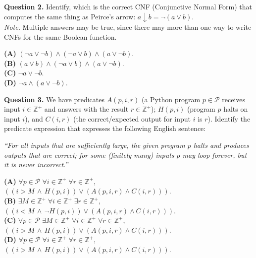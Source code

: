 \documentclass[jou]{apa6}
\begin{document}
\vspace{6pt}
{\bf Question 2.} Identify, which is the correct CNF 
(Conjunctive Normal Form) that computes the same thing as 
Peirce's arrow: $a \downarrow b = \neg (a \vee b)$.\\
{\em Note.} Multiple answers may be true, since
there may more than one way to write CNFs for the same Boolean 
function.

\noindent
{\normalsize \bf (A)} %
$(\neg a \vee \neg b) \wedge (\neg a \vee b) \wedge (a \vee \neg b)$.\\[3pt]
{\normalsize \bf (B)}
$(a \vee b) \wedge (\neg a \vee b) \wedge (a \vee \neg b)$.\\[3pt]
{\normalsize \bf (C)}
$\neg a \vee \neg b$.\\[3pt]
{\normalsize \bf (D)} %
$\neg a \wedge (a \vee \neg b)$.



\vspace{6pt}
{\bf Question 3.} We have predicates $A(p,i,r)$ (a Python program 
$p \in \mathcal{P}$ receives input $i \in \mathbb{Z}^{+}$ and answers
with the result $r \in \mathbb{Z}^{+}$); $H(p,i)$ (program $p$ halts on input $i$), 
and $C(i,r)$ (the correct/expected output for input $i$ is $r$). 
Identify the predicate expression that expresses the following English sentence:

{\em ``For all inputs that are sufficiently large, the given program $p$ 
halts and produces outputs that are correct; for some (finitely many) inputs $p$ 
may loop forever, but it is never incorrect.''}




\noindent
{\normalsize \bf (A)}
$\forall p \in \mathcal{P}\; \forall i \in \mathbb{Z}^{+}\; \forall r \in \mathbb{Z}^{+},$\\
$((i > M \,\wedge\, H(p,i)) \vee (A(p,i,r) \wedge C(i,r)))$.\\[3pt]
{\normalsize \bf (B)}
$\exists M \in \mathbb{Z}^{+}\; \forall i \in \mathbb{Z}^{+}\;
\exists r \in \mathbb{Z}^{+},$\\
$((i < M \,\wedge\, \neg H(p,i)) \vee (A(p,i,r) \wedge C(i,r)))$.\\[3pt]
{\normalsize \bf (C)}
$\forall p \in \mathcal{P}\; \exists M \in \mathbb{Z}^{+}\; \forall i \in \mathbb{Z}^{+}\;
\forall r \in \mathbb{Z}^{+},$\\
$((i > M \,\wedge\, H(p,i)) \vee (A(p,i,r) \wedge C(i,r)))$.\\[3pt]
{\normalsize \bf (D)}
$\forall p \in \mathcal{P}\; \forall i \in \mathbb{Z}^{+}\;
\forall r \in \mathbb{Z}^{+},$\\
$((i > M \,\wedge\, H(p,i)) \vee (A(p,i,r) \wedge C(i,r)))$.
\end{document}

